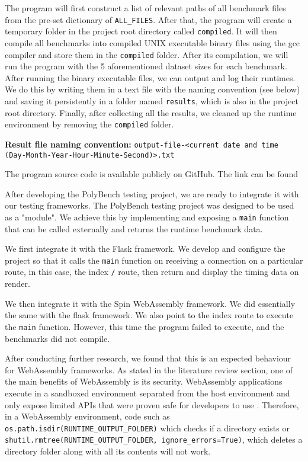 The program will first construct a list of relevant paths of all benchmark files from the pre-set dictionary of \texttt{ALL_FILES}. After that, the program will create a temporary folder in the project root directory called \texttt{compiled}. It will then compile all benchmarks into compiled UNIX executable binary files using the gcc compiler and store them in the \texttt{compiled} folder. After its compilation, we will run the program with the 5 aforementioned dataset sizes for each benchmark. After running the binary executable files, we can output and log their runtimes. We do this by writing them in a text file with the naming convention (see below) and saving it persistently in a folder named \texttt{results}, which is also in the project root directory. Finally, after collecting all the results, we cleaned up the runtime environment by removing the \texttt{compiled} folder.

\textbf{Result file naming convention:}
\newline
\texttt{output-file-<current date and time (Day-Month-Year-Hour-Minute-Second)>.txt}

The program source code is available publicly on GitHub.
\newline
The link can be found \href{https://github.com/richard875/Honours-PolyBench}{\color{blue}{here (GitHub: richard875/Honours-PolyBench)}}

After developing the PolyBench testing project, we are ready to integrate it with our testing frameworks. The PolyBench testing project was designed to be used as a "module". We achieve this by implementing and exposing a \texttt{main} function that can be called externally and returns the runtime benchmark data.

We first integrate it with the Flask framework. We develop and configure the project so that it calls the \texttt{main} function on receiving a connection on a particular route, in this case, the index \texttt{/} route, then return and display the timing data on render.

We then integrate it with the Spin WebAssembly framework. We did essentially the same with the flask framework. We also point to the index route to execute the \texttt{main} function. However, this time the program failed to execute, and the benchmarks did not compile.

After conducting further research, we found that this is an expected behaviour for WebAssembly frameworks. As stated in the literature review section, one of the main benefits of WebAssembly is its security. WebAssembly applications execute in a sandboxed environment separated from the host environment and only expose limited APIs that were proven safe for developers to use \cite{exp46}. Therefore, in a WebAssembly environment, code such as \texttt{os.path.isdir(RUNTIME_OUTPUT_FOLDER)} which checks if a directory exists or \texttt{shutil.rmtree(RUNTIME_OUTPUT_FOLDER, ignore_errors=True)}, which deletes a directory folder along with all its contents will not work.

